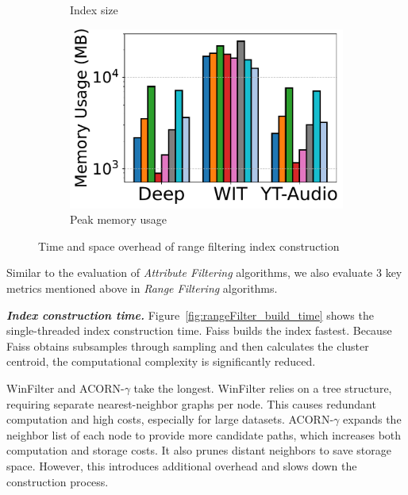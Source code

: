 \documentclass[sigconf, nonacm]{acmart}
\begin{document}
\begin{figure}[t]
\begin{subfigure}[t]{0.32\columnwidth}
			\caption{Index size}
			\label{fig:rangeFilter_index_size_mb}
		\end{subfigure}
		\hfill
		\begin{subfigure}[t]{0.32\columnwidth}
			\centering
			\setlength{\abovecaptionskip}{0.02cm}
			\setlength{\belowcaptionskip}{0.02cm}
			\includegraphics[width=\linewidth]{figures/indexData/rangeFilter_memory_mb_comparison_query.pdf}
			\caption{Peak memory usage}
			\label{fig:rangeFilter_memory_mb}
		\end{subfigure}
		
		\caption{Time and space overhead of range filtering index construction}
		\label{fig:rangeFilter_build_index_comparison}
	\end{figure}
	
	Similar to the evaluation of \textit{Attribute Filtering} algorithms, we also evaluate 3 key metrics mentioned above in \textit{Range Filtering} algorithms.
	

	\textit{\textbf{Index construction time.}}
	Figure~\ref{fig:rangeFilter_build_time} shows the single-threaded index construction time. Faiss builds the index fastest. Because Faiss obtains subsamples through sampling and then calculates the cluster centroid, the computational complexity is significantly reduced.
	
	WinFilter and ACORN-\(\gamma\) take the longest.
	WinFilter relies on a tree structure, requiring separate nearest-neighbor graphs per node. This causes redundant computation and high costs, especially for large datasets.
	ACORN-\(\gamma\) expands the neighbor list of each node to provide more candidate paths, which increases both computation and storage costs. It also prunes distant neighbors to save storage space. However, this introduces additional overhead and slows down the construction process.
\end{document}
